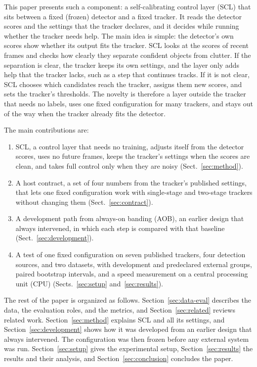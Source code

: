 \documentclass[pdflatex,referee,sn-mathphys-num]{sn-jnl}
\newcommand{\scl}{SCL}
\newcommand{\aob}{AOB}
\begin{document}
This paper presents such a component: a self-calibrating control layer (\scl{})
that sits between a fixed (frozen) detector and a fixed tracker. It reads the
detector scores and the settings that the tracker declares, and it decides
while running whether the tracker needs help. The main idea is simple: the
detector's own scores show whether its output fits the tracker. \scl{} looks
at the scores of recent frames and checks how clearly they separate confident
objects from clutter. If the separation is clear, the tracker keeps its own
settings, and the layer only adds help that the tracker lacks, such as a step
that continues tracks. If it is not clear, \scl{} chooses which candidates
reach the tracker, assigns them new scores, and sets the tracker's thresholds.
The novelty is therefore a layer outside the tracker that needs no labels,
uses one fixed configuration for many trackers, and stays out of the way when
the tracker already fits the detector.

The main contributions are:
\begin{enumerate}
\item \scl{}, a control layer that needs no training, adjusts itself from the
      detector scores, uses no future frames, keeps the tracker's settings
      when the scores are clean, and takes full control only when they are
      noisy (Sect.~\ref{sec:method}).
\item A host contract, a set of four numbers from the tracker's published
      settings, that lets one fixed configuration work with single-stage and
      two-stage trackers without changing them (Sect.~\ref{sec:contract}).
\item A development path from always-on banding (\aob{}), an earlier design
      that always intervened, in which each step is compared with that
      baseline (Sect.~\ref{sec:development}).
\item A test of one fixed configuration on seven published trackers, four
      detection sources, and two datasets, with development and predeclared
      external groups, paired bootstrap intervals, and a speed measurement on
      a central processing unit (CPU) (Sects.~\ref{sec:setup} and~\ref{sec:results}).
\end{enumerate}

The rest of the paper is organized as follows. Section~\ref{sec:data-eval}
describes the data, the evaluation roles, and the metrics, and
Section~\ref{sec:related} reviews related work. Section~\ref{sec:method}
explains \scl{} and all its settings, and Section~\ref{sec:development} shows
how it was developed from an earlier design that always intervened. The
configuration was then frozen before any external system was run.
Section~\ref{sec:setup} gives the experimental setup,
Section~\ref{sec:results} the results and their analysis, and
Section~\ref{sec:conclusion} concludes the paper.
\end{document}
